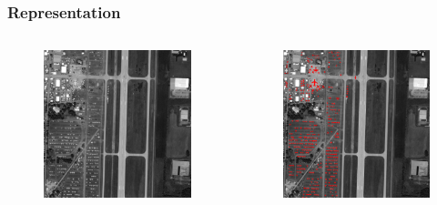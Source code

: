 \documentclass{beamer}
\begin{document}
\begin{frame}
\frametitle{Representation}

\begin{columns}[c]

\begin{figure}
\centering
\includegraphics[width=50mm ]{resources/airplane-original.jpg}
\end{figure}

\begin{figure}
\centering
\includegraphics[width=50mm ]{resources/airplane-ground-truth.jpg}
\end{figure}
\end{columns}

\end{frame}
\end{document}
